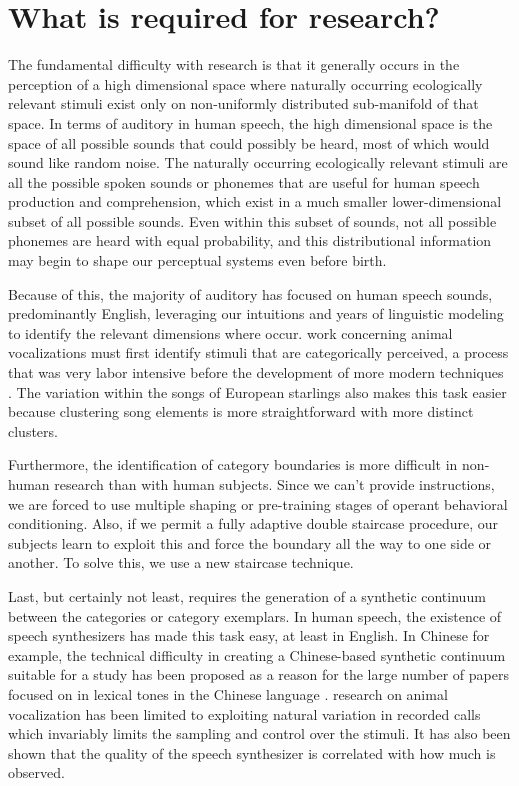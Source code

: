 \section{What is required for \CP research?}

The fundamental difficulty with \CP research is that it generally occurs in the perception of a high dimensional space where naturally occurring ecologically relevant stimuli exist only on non-uniformly distributed sub-manifold of that space. In terms of auditory \CP in human speech, the high dimensional space is the space of all possible sounds that could possibly be heard, most of which would sound like random noise. The naturally occurring ecologically relevant stimuli are all the possible spoken sounds or phonemes that are useful for human speech production and comprehension, which exist in a much smaller lower-dimensional subset of all possible sounds. Even within this subset of sounds, not all possible phonemes are heard with equal probability, and this distributional information may begin to shape our perceptual systems even before birth.

Because of this, the majority of auditory \CP has focused on human speech sounds, predominantly English, leveraging our intuitions and years of linguistic modeling to identify the relevant dimensions where \CP occur. \CP work concerning animal vocalizations must first identify stimuli that are categorically perceived, a process that was very labor intensive \cite{nelson1989categorical,prather2009neural,lachlan2015context} before the development of more modern techniques \cite{sainburg2019parallels}. The variation within the songs of European starlings also makes this task easier because clustering song elements is more straightforward with more distinct clusters.

Furthermore, the identification of category boundaries is more difficult in non-human research than with human subjects. Since we can't provide instructions, we are forced to use multiple shaping or pre-training stages of operant behavioral conditioning. Also, if we permit a fully adaptive double staircase procedure, our subjects learn to exploit this and force the boundary all the way to one side or another. To solve this, we use a new staircase technique.

Last, but certainly not least, \CP requires the generation of a synthetic continuum between the categories or category exemplars. In human speech, the existence of speech synthesizers has made this task easy, at least in English. In Chinese for example, the technical difficulty in creating a Chinese-based synthetic continuum suitable for a \CP study has been proposed as a reason for the large number of papers focused on \CP in lexical tones in the Chinese language \cite{zhang2013categorical}. \CP research on animal vocalization has been limited to exploiting natural variation in recorded calls \cite{nelson1989categorical,prather2009neural,lachlan2015context} which invariably limits the sampling and control over the stimuli. It has also been shown that the quality of the speech synthesizer is correlated with how much \CP is observed\cite{van1999categorical}.

